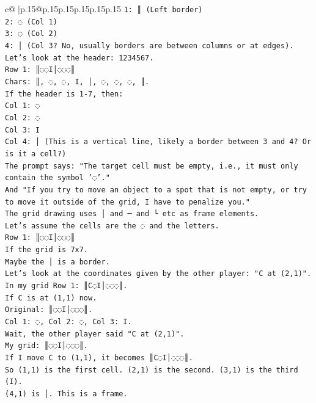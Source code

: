 \documentclass{article}
\begin{document}
{\begin{supertabular}{c@{$\;$}|p{.15\linewidth}@{}p{.15\linewidth}p{.15\linewidth}p{.15\linewidth}p{.15\linewidth}p{.15\linewidth}}
{{{\texttt{1: ║ (Left border)} \\
\texttt{2: ◌ (Col 1)} \\
\texttt{3: ◌ (Col 2)} \\
\texttt{4: │ (Col 3? No, usually borders are between columns or at edges).} \\
\texttt{Let's look at the header:  1234567.} \\
\texttt{Row 1: ║◌◌I│◌◌◌║} \\
\texttt{Chars: ║, ◌, ◌, I, │, ◌, ◌, ◌, ║.} \\
\texttt{If the header is 1{-}7, then:} \\
\texttt{Col 1: ◌} \\
\texttt{Col 2: ◌} \\
\texttt{Col 3: I} \\
\texttt{Col 4: │ (This is a vertical line, likely a border between 3 and 4? Or is it a cell?)} \\
\texttt{The prompt says: "The target cell must be empty, i.e., it must only contain the symbol '◌'."} \\
\texttt{And "If you try to move an object to a spot that is not empty, or try to move it outside of the grid, I have to penalize you."} \\
\texttt{The grid drawing uses │ and ─ and └ etc as frame elements.} \\
\texttt{Let's assume the cells are the ◌ and the letters.} \\
\texttt{Row 1: ║◌◌I│◌◌◌║} \\
\texttt{If the grid is 7x7.} \\
\texttt{Maybe the │ is a border.} \\
\texttt{Let's look at the coordinates given by the other player: "C at (2,1)".} \\
\texttt{In my grid Row 1: ║C◌I│◌◌◌║.} \\
\texttt{If C is at (1,1) now.} \\
\texttt{Original: ║◌◌I│◌◌◌║.} \\
\texttt{Col 1: ◌, Col 2: ◌, Col 3: I.} \\
\texttt{Wait, the other player said "C at (2,1)".} \\
\texttt{My grid: ║◌◌I│◌◌◌║.} \\
\texttt{If I move C to (1,1), it becomes ║C◌I│◌◌◌║.} \\
\texttt{So (1,1) is the first cell. (2,1) is the second. (3,1) is the third (I).} \\
\texttt{(4,1) is │. This is a frame.} \\
}}}
\end{supertabular}}
\end{document}
